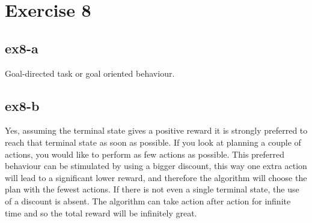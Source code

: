 \section{Exercise 8}
\subsection{ex8-a}
Goal-directed task or goal oriented behaviour.

\subsection{ex8-b}
Yes, assuming the terminal state gives a positive reward it is strongly preferred to reach
that terminal state as soon as possible. If you look at planning a couple of actions, you would
like to perform as few actions as possible. This preferred behaviour can be stimulated by 
using a bigger discount, this way one extra action will lead to a significant lower reward,
and therefore the algorithm will choose the plan with the fewest actions. If there is not 
even a single terminal state, the use of a discount is absent. The algorithm can take action
after action for infinite time and so the total reward will be infinitely great.